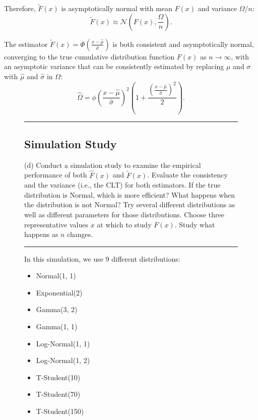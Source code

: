 \documentclass{article}
\newenvironment{colorparagraph}[1]{\par\color{#1}}{\par}
\begin{document}
Therefore, \( \tilde{F}(x) \) is asymptotically normal with mean \( F(x) \) and variance \( \Omega / n \):
\[
\tilde{F}(x) \approx \mathcal{N}\left( F(x), \frac{\Omega}{n} \right).
\]

The estimator \( \tilde{F}(x) = \Phi\left( \frac{x - \hat{\mu}}{\hat{\sigma}} \right) \) is both consistent and asymptotically normal, converging to the true cumulative distribution function \( F(x) \) as \( n \to \infty \), with an asymptotic variance that can be consistently estimated by replacing \( \mu \) and \( \sigma \) with \( \hat{\mu} \) and \( \hat{\sigma} \) in \( \Omega \):
\[
\hat{\Omega} = \phi\left( \frac{x - \hat{\mu}}{\hat{\sigma}} \right)^2 \left( 1 + \frac{\left( \frac{x - \hat{\mu}}{\hat{\sigma}} \right)^2}{2} \right).
\]

\begin{figure}[H]
\begin{colorparagraph}{questioncolor}
\label{q2d}
\rule{\textwidth}{0.5pt}
\subsection{Simulation Study}
(d) Conduct a simulation study to examine the empirical performance of both \( \hat{F}(x) \) and \( \tilde{F}(x) \).
Evaluate the consistency and the variance (i.e., the CLT) for both estimators. If the true distribution is Normal, which is more efficient? What happens when the distribution is not Normal? Try several different distributions as well as different parameters for those distributions. Choose three representative values \( x \) at which to study \( F(x) \). Study what happens as \( n \) changes.

\rule{\textwidth}{0.5pt}
\end{colorparagraph}

In this simulation, we use 9 different distributions:
\begin{itemize}
  \item Normal(1, 1)
  \item Exponential(2)
  \item Gamma(3, 2)
  \item Gamma(1, 1)
  \item Log-Normal(1, 1)
  \item Log-Normal(1, 2)
  \item T-Student(10)
  \item T-Student(70)
  \item T-Student(150)
\end{itemize}
\end{figure}
\end{document}
